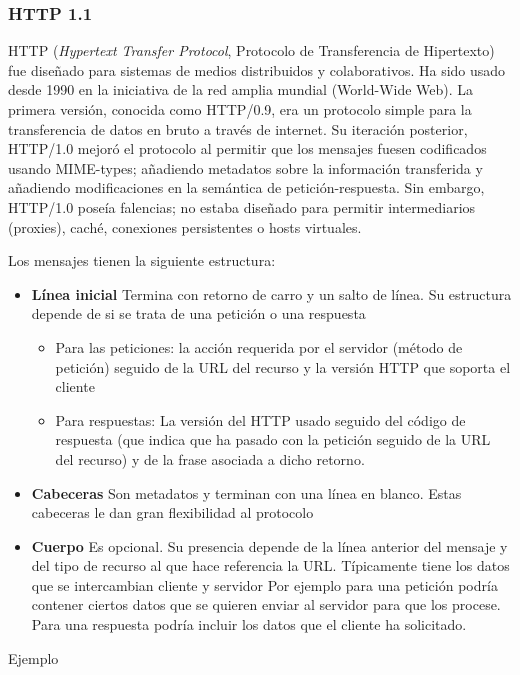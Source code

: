 \subsubsection{HTTP 1.1}
HTTP (\textit{Hypertext Transfer Protocol},  Protocolo de Transferencia de Hipertexto) fue diseñado para sistemas de medios distribuidos y colaborativos. Ha sido usado desde 1990 en la iniciativa de la red amplia mundial (World-Wide Web). La primera versión, conocida como HTTP/0.9, era un protocolo simple para la transferencia de datos en bruto a través de internet. Su iteración posterior, HTTP/1.0 mejoró el protocolo al permitir que los mensajes fuesen codificados usando MIME-types; añadiendo metadatos sobre la información transferida y añadiendo modificaciones en la semántica de petición-respuesta. Sin embargo, HTTP/1.0 poseía falencias; no estaba diseñado para permitir intermediarios (proxies), caché, conexiones persistentes o hosts virtuales.

Los mensajes tienen la siguiente estructura:

\begin{itemize}
  \item \textbf{Línea inicial} Termina con retorno de carro y un salto de línea. Su estructura depende de si se trata de una petición o una respuesta
    \begin{itemize}
      \item Para las peticiones: la acción requerida por el servidor (método de petición) seguido de la URL del recurso y la versión HTTP que soporta el cliente
      \item Para respuestas: La versión del HTTP usado seguido del código de respuesta (que indica que ha pasado con la petición seguido de la URL del recurso) y de la frase asociada a dicho retorno.
    \end{itemize}
  \item \textbf{Cabeceras} Son metadatos y terminan con una línea en blanco. Estas cabeceras le dan gran flexibilidad al protocolo
  \item \textbf{Cuerpo} Es opcional. Su presencia depende de la línea anterior del mensaje y del tipo de recurso al que hace referencia la URL. Típicamente tiene los datos que se intercambian cliente y servidor Por ejemplo para una petición podría contener ciertos datos que se quieren enviar al servidor para que los procese. Para una respuesta podría incluir los datos que el cliente ha solicitado.
\end{itemize}

Ejemplo
\\

